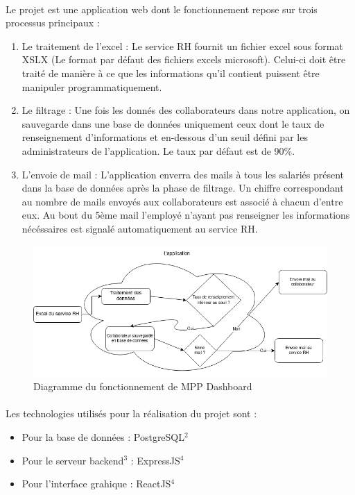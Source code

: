 \documentclass[12pt]{article}
\begin{document}
\begin {sloppypar}
\paragraph {} 
Le projet est une application web dont le fonctionnement repose sur trois processus
principaux : 
\begin {enumerate}
  \item 
    Le traitement de l'excel : Le service RH fournit un fichier excel sous format XSLX 
    (Le format par défaut des fichiers excels microsoft). Celui-ci doit être traité de 
    manière à ce que les informations qu'il contient puissent être manipuler 
    programmatiquement.
  \item 
    Le filtrage : Une fois les donnés des collaborateurs dans notre application, on
    sauvegarde dans une base de données uniquement ceux dont le taux de renseignement 
    d'informations et en-dessous d'un seuil défini par les administrateurs de 
    l'application. Le taux par défaut est de 90\%. 
  \item 
    L'envoie de mail : L'application enverra des mails à tous les salariés présent 
    dans la base de données après la phase de filtrage. Un chiffre correspondant au nombre
    de mails envoyés aux collaborateurs est associé à chacun d'entre eux. Au bout du 
    5ème mail l'employé n'ayant pas renseigner les informations nécéssaires est signalé 
    automatiquement au service RH.
\end{enumerate}
\newpage
\begin{figure}
  \includegraphics[width=\textwidth] {mpp-diagram.png}
  \caption {Diagramme du fonctionnement de MPP Dashboard}
\end{figure}
\paragraph {}
Les technologies utilisés pour la réalisation du projet sont : 
\begin {itemize}
\item   
  Pour la base de données : PostgreSQL$^{2}$ 
\item 
  Pour le serveur backend$^{3}$ : ExpressJS$^{4}$
\item 
  Pour l'interface grahique : ReactJS$^{4}$
\end {itemize}


\end{sloppypar}
\end{document}

